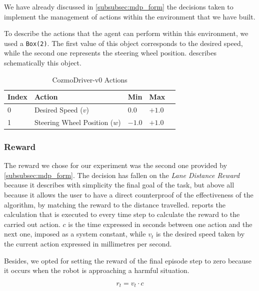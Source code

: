 We have already discussed in \vref{subsubsec:mdp_form} the decisions taken to implement the management of actions within the environment that we have built.

To describe the actions that the agent can perform within this environment, we used a \texttt{Box(2)}.
The first value of this object corresponds to the desired speed, while the second one represents the steering wheel position.
 describes schematically this object.

\begin{table}[!h]
    \centering
    \caption{CozmoDriver-v0 Actions}
    \label{table:cozmo_actions}
    \begin{tabular}{@{}lllll@{}}
        \toprule
        Index & Action                        & Min    & Max    \\ \midrule
        0     & Desired Speed ($v$)           & $0.0$  & $+1.0$ \\
        1     & Steering Wheel Position ($w$) & $-1.0$ & $+1.0$ \\

        \bottomrule
    \end{tabular}
\end{table}

\subsubsection{Reward}

The reward we chose for our experiment was the second one provided by \vref{subsubsec:mdp_form}.
The decision has fallen on the \textit{Lane Distance Reward} because it describes with simplicity the final goal of the task, but above all because it allows the user to have a direct counterproof of the effectiveness of the algorithm, by matching the reward to the distance travelled.
 reports the calculation that is executed to every time step to calculate the reward to the carried out action.
$c$ is the time expressed in seconds between one action and the next one, imposed as a system constant, while $v_t$ is the desired speed taken by the current action expressed in millimetres per second.

Besides, we opted for setting the reward of the final episode step to zero because it occurs when the robot is approaching a harmful situation.

\begin{equation}
    \label{eq:reward_fun}
    r_t = v_t \cdot c
\end{equation}

